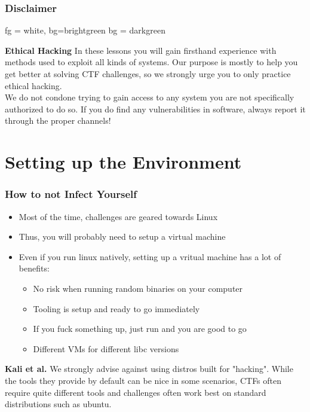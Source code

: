 \documentclass[aspectratio=169]{beamer}
\begin{document}
\begin{frame}
    \frametitle{Disclaimer}
    {
         {fg = white, bg=brightgreen}
         {bg = darkgreen}
    \begin{alertblock}{\textbf{Ethical Hacking}}
    {
        In these lessons you will gain firsthand experience with methods used to exploit all kinds of systems.
        Our purpose is mostly to help you get better at solving CTF challenges, so we strongly urge you to only practice ethical hacking.\\
        We do not condone trying to gain access to any system you are not specifically authorized to do so.
        If you do find any vulnerabilities in software, always report it through the proper channels!
    }
    \end{alertblock}
    }
\end{frame}

\section{Setting up the Environment}
\begin{frame}[fragile]
    \frametitle{How to not Infect Yourself}
    \begin{itemize}
        \item Most of the time, challenges are geared towards Linux
        \item Thus, you will probably need to setup a virtual machine
        \item Even if you run linux natively, setting up a vritual machine has a lot of benefits:
        \begin{itemize}
            \item No risk when running random binaries on your computer
            \item Tooling is setup and ready to go immediately
            \item If you fuck something up, just run  and you are good to go
            \item Different VMs for different libc versions
        \end{itemize}
    \end{itemize}
    \pause
    \begin{alertblock}{\textbf{Kali et al.}}
        {
            We strongly advise against using distros built for "hacking".
            While the tools they provide by default can be nice in some scenarios, CTFs often require quite different tools and challenges often work best on standard distributions such as ubuntu.
        }
    \end{alertblock}
\end{frame}
\end{document}
